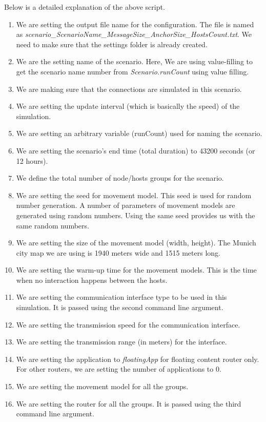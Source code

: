 Below is a detailed explanation of the above script.
\begin{enumerate}
  \item We are setting the output file name for the configuration. The file is named as \textit{scenario\_ScenarioName\_MessageSize\_AnchorSize\_HostsCount.txt}. We need to make sure that the settings folder is already created.
  \item We are the setting name of the scenario. Here, We are using value-filling to get the scenario name number from \textit{Scenario.runCount} using value filling.
  \item We are making sure that the connections are simulated in this scenario.
  \item We are setting the update interval (which is basically the speed) of the simulation.
  \item We are setting an arbitrary variable (runCount) used for naming the scenario.
  \item We are setting the scenario's end time (total duration) to 43200 seconds (or 12 hours).
  \item We define the total number of node/hosts groups for the scenario.
  \item We are setting the seed for movement model. This seed is used for random number generation. A number of parameters of movement models are generated using random numbers. Using the same seed provides us with the same random numbers.
  \item We are setting the size of the movement model (width, height). The Munich city map we are using is 1940 meters wide and 1515 meters long.
  \item We are setting the warm-up time for the movement models. This is the time when no interaction happens between the hosts.
  \item We are setting the communication interface type to be used in this simulation. It is passed using the second command line argument.
  \item We are setting the transmission speed for the communication interface.
  \item We are setting the transmission range (in meters) for the interface.
  \item We are setting the application to \textit{floatingApp} for floating content router only. For other routers, we are setting the number of applications to 0.
  \item We are setting the movement model for all the groups.
  \item We are setting the router for all the groups. It is passed using the third command line argument.

\end{enumerate}
